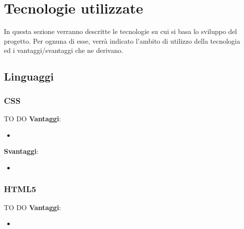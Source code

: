 %
%


\section{Tecnologie utilizzate} %
\label{sec:tecnologie_utilizzate}
In questa sezione verranno descritte le tecnologie su cui si basa lo sviluppo del progetto. Per ognuna di esse, verrà indicato l’ambito di utilizzo della tecnologia ed i vantaggi/svantaggi che ne derivano.

	\subsection{Linguaggi} %
	\label{sub:linguaggi}

		\subsubsection{CSS} %
		\label{ssub:css}
		TO DO \newline
		\textbf{Vantaggi}:
			\begin{itemize}
				\item 
			\end{itemize}
			\noindent
		
		\textbf{Svantaggi}:
			\begin{itemize}
				\item 
			\end{itemize}
			\noindent

		\subsubsection{HTML5} %
		\label{ssub:html}
		TO DO \newline
		\textbf{Vantaggi}:
			\begin{itemize}
				\item 
			\end{itemize}
			\noindent
		
